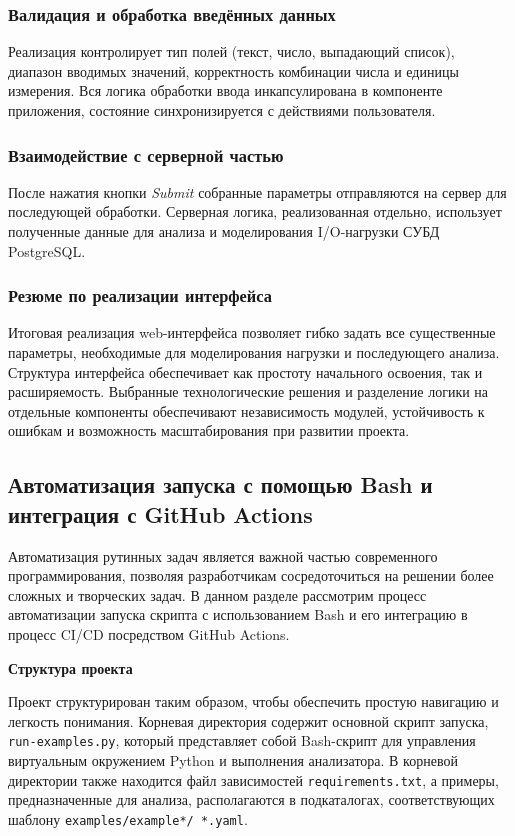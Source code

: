 \subsubsection{Валидация и обработка введённых данных}

Реализация контролирует тип полей (текст, число, выпадающий список), диапазон вводимых значений, корректность комбинации числа и единицы измерения. Вся логика обработки ввода инкапсулирована в компоненте приложения, состояние синхронизируется с действиями пользователя.

\subsubsection{Взаимодействие с серверной частью}

После нажатия кнопки \emph{Submit} собранные параметры отправляются на сервер для последующей обработки. Серверная логика, реализованная отдельно, использует полученные данные для анализа и моделирования I/O-нагрузки СУБД PostgreSQL.

\subsubsection{Резюме по реализации интерфейса}

Итоговая реализация web-интерфейса позволяет гибко задать все существенные параметры, необходимые для моделирования нагрузки и последующего анализа. Структура интерфейса обеспечивает как простоту начального освоения, так и расширяемость. Выбранные технологические решения и разделение логики на отдельные компоненты обеспечивают независимость модулей, устойчивость к ошибкам и возможность масштабирования при развитии проекта.


\subsection{Автоматизация запуска с помощью Bash и интеграция с GitHub Actions}

Автоматизация рутинных задач является важной частью современного программирования, позволяя разработчикам сосредоточиться на решении более сложных и творческих задач. В данном разделе рассмотрим процесс автоматизации запуска скрипта с использованием Bash и его интеграцию в процесс CI/CD посредством GitHub Actions.

\textbf{Структура проекта}

Проект структурирован таким образом, чтобы обеспечить простую навигацию и легкость понимания. Корневая директория содержит основной скрипт запуска, \texttt{run-examples.py}, который представляет собой Bash-скрипт для управления виртуальным окружением Python и выполнения анализатора. В корневой директории также находится файл зависимостей \texttt{requirements.txt}, а примеры, предназначенные для анализа, располагаются в подкаталогах, соответствующих шаблону \texttt{examples/example*/\ *.yaml}.

